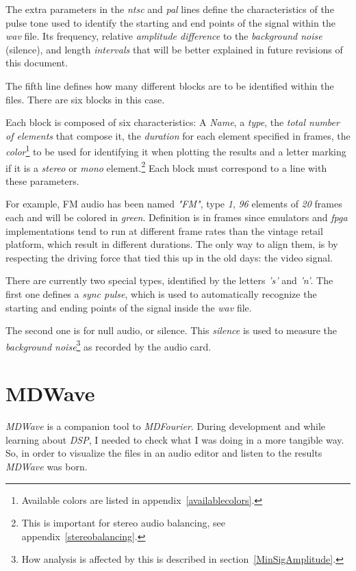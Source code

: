 \documentclass[10pt,a4paper]{report}
\newcommand{\ac}[1]{\textit{\mbox{\acrshort{#1}}}}
\begin{document}
\begin{appendices}
The extra parameters in the \ac{ntsc} and \ac{pal} lines define the characteristics of the pulse tone used to identify the starting and end points of the signal within the \ac{wav} file. Its frequency, relative \textit{amplitude difference} to the \textit{background noise} (silence), and length \textit{intervals} that will be better explained in future revisions of this document.

The fifth line defines how many different blocks are to be identified within the files. There are six blocks in this case.

Each block is composed of six characteristics: A \textit{Name}, a \textit{type}, the \textit{total number of elements} that compose it, the \textit{duration} for each element specified in frames, the \textit{color}\footnote{Available colors are listed in appendix~\ref{availablecolors}.} to be used for identifying it when plotting the results and a letter marking if it is a \textit{stereo} or \textit{mono} element.\footnote{This is important for stereo audio balancing, see appendix~\ref{stereobalancing}.} Each block must correspond to a line with these parameters.

For example, FM audio has been named \textit{"FM"}, type \textit{1}, \textit{96} elements of \textit{20} frames each and will be colored in \textit{green}. Definition is in frames since emulators and \ac{fpga} implementations tend to run at different frame rates than the vintage retail platform, which result in different durations. The only way to align them, is by respecting the driving force that tied this up in the old days: the video signal.

There are currently two special types, identified by the letters \textit{'s'} and \textit{'n'}. The first one defines a \textit{sync pulse}, which is used to automatically recognize the starting and ending points of the signal inside the \ac{wav} file. 

The second one is for null audio, or silence. This \textit{silence} is used to measure the \textit{background noise}\footnote{How analysis is affected by this is described in section~\ref{MinSigAmplitude}.} as recorded by the audio card. 	

\chapter{MDWave}
\label{mdwave}

\textit{MDWave} is a companion tool to \textit{MDFourier}. During development and while learning about \textit{DSP}, I needed to check what I was doing in a more tangible way. So, in order to visualize the files in an audio editor and listen to the results \textit{MDWave} was born.


\end{appendices}
\end{document}
